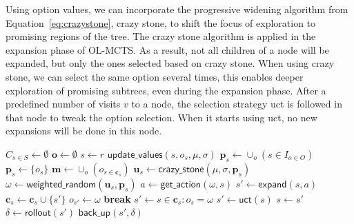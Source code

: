 Using option values, we can incorporate the progressive widening algorithm from
Equation~\ref{eq:crazystone}, crazy stone, to shift the focus of exploration to
promising regions of the tree. The crazy stone algorithm is applied in the
expansion phase of OL-MCTS\@.  As a result, not all children of a node will be
expanded, but only the ones selected based on crazy stone. When using crazy
stone, we can select the same option several times, this enables deeper
exploration of promising subtrees, even during the expansion phase. After a
predefined number of visits $v$ to a node, the selection strategy \textsf{uct}
is followed in that node to tweak the option selection. When it starts using
\textsf{uct}, no new expansions will be done in this node.

\begin{algorithm}[h]
	\caption{$\mathsf{OL-MCTS}(O, r, t, d, v, \mu, \sigma)$}
	\label{alg:olmcts}
	\begin{algorithmic}[1]
		\State $C_{s \in S} \gets \emptyset$
		\State $\mathbf{o} \gets \emptyset$
		 \label{alg:olmcts:mainloop}
			\State $s \gets r$
			 \label{alg:olmcts:innerloop}
				 \label{alg:olmcts:sp}
					\State $\mathsf{update\_values}(s, o_s, \mu, \sigma)$
						 \label{alg:olmcts:update}
					\State $\mathbf{p}_s \gets \cup_o (s \in I_{o \in O})$
				\Else
					\State $\mathbf{p}_s \gets \{o_s\}$
				\EndIf \label{alg:olmcts:scs}
				\State $\mathbf{m} \gets \cup_o (o_{s \in \mathbf{c}_s})$
				 
					\label{alg:olmcts:ns}
					\State $\mathbf{u}_s \gets \mathsf{crazy\_stone}(\mu, \sigma, \mathbf{p}_s)$
					\State $\omega \gets \mathsf{weighted\_random}(\mathbf{u}_s, \mathbf{p}_s)$
					 
						\State $a \gets \mathsf{get\_action}(\omega, s)$ \label{alg:olmcts:scs}
						\State $s' \gets \mathsf{expand}(s, a)$ 
						\State $\mathbf{c}_s \gets \mathbf{c}_s \cup \{s'\}$
						\State $o_{s'} \gets \omega$
						\State \textbf{break} \label{alg:olmcts:ecs}
					\Else {}
						\State $s' \gets s \in \mathbf{c}_s : o_s = \omega$ \label{alg:olmcts:s} 
					\EndIf
				\Else {}
					\State $s' \gets \mathsf{uct}(s)$ \label{alg:olmcts:uct}
				\EndIf \label{alg:olmcts:ecs}
				\State $s \gets s'$ \label{alg:olmcts:ss}
			\EndWhile
			\State $\delta \gets \mathsf{rollout}(s')$ \label{alg:olmcts:rollout}
			\State $\mathsf{back\_up}(s', \delta)$ \label{alg:olmcts:backup}
		\EndWhile
	\end{algorithmic}
\end{algorithm}

